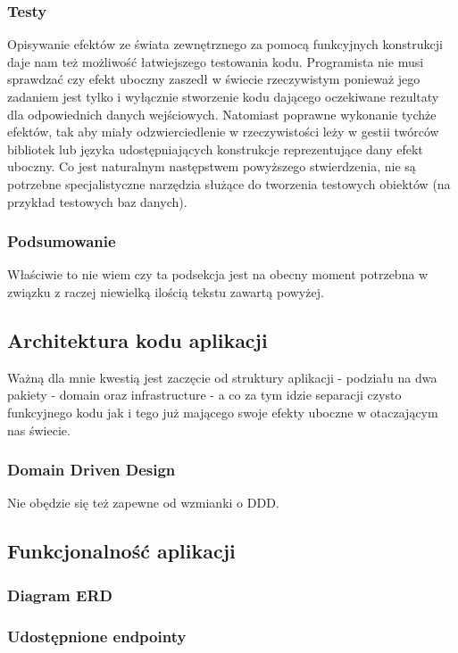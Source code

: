 \documentclass[../main.tex]{subfiles}
\begin{document}
\subsubsection{Testy}
Opisywanie efektów ze świata zewnętrznego za pomocą funkcyjnych konstrukcji daje nam też możliwość łatwiejszego testowania kodu. Programista nie musi sprawdzać czy efekt uboczny zaszedł w świecie rzeczywistym ponieważ jego zadaniem jest tylko i wyłącznie stworzenie kodu dającego oczekiwane rezultaty dla odpowiednich danych wejściowych. Natomiast poprawne wykonanie tychże efektów, tak aby miały odzwierciedlenie w rzeczywistości leży w gestii twórców bibliotek lub języka udostępniających konstrukcje reprezentujące dany efekt uboczny. Co jest naturalnym następstwem powyższego stwierdzenia, nie są potrzebne specjalistyczne narzędzia służące do tworzenia testowych obiektów (na przykład testowych baz danych).

\subsubsection{Podsumowanie}
Właściwie to nie wiem czy ta podsekcja jest na obecny moment potrzebna w związku z raczej niewielką ilością tekstu zawartą powyżej.
\vspace{15ex}





\subsection{Architektura kodu aplikacji}
Ważną dla mnie kwestią jest zaczęcie od struktury aplikacji - podziału na dwa pakiety - domain oraz infrastructure - a co za tym idzie separacji czysto funkcyjnego kodu jak i tego już mającego swoje efekty uboczne w otaczającym nas świecie.

\subsubsection{Domain Driven Design}
Nie obędzie się też zapewne od wzmianki o DDD.











\subsection{Funkcjonalność aplikacji}

\subsubsection{Diagram ERD}

\subsubsection{Udostępnione endpointy}
\end{document}
